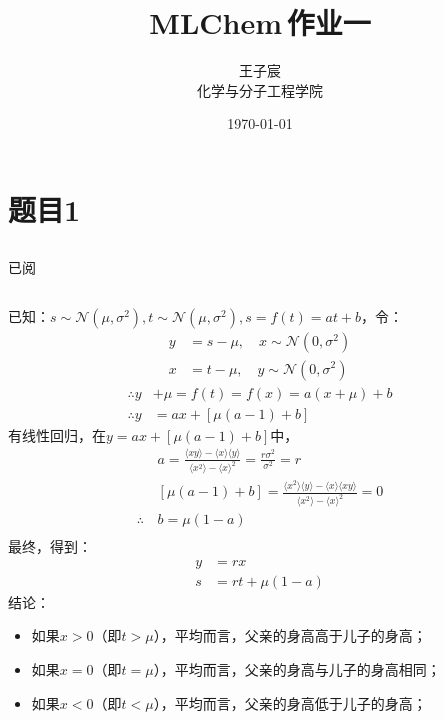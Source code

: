 \documentclass{article}
\title{\huge{\textbf{MLChem\,作业一}}}
\author{\kaishu 2100011873 王子宸\\
        \kaishu 化学与分子工程学院}
\date{\kaishu \today}
\begin{document}
\maketitle

\section{题目1}

\subsection{}
已阅
\subsection{}

已知：$s\sim \mathcal{N}(\mu,\sigma^2), t\sim \mathcal{N}(\mu,\sigma^2), s = f(t) = at + b$，令：
\begin{align*}
    y &= s - \mu,\quad x\sim \mathcal{N}(0,\sigma^2)\\
    x &= t - \mu,\quad y\sim \mathcal{N}(0,\sigma^2)
\end{align*}
\begin{align*}
    \therefore  y& + \mu = f(t) = f(x) = a(x + \mu) + b\\
    \therefore  y& = ax + [\mu(a-1)+b]
\end{align*}
有线性回归，在$y = ax + [\mu(a-1)+b]$中，
\begin{align*}
    &a = \frac{\langle xy \rangle-\langle x\rangle\langle y\rangle}{\langle x^2\rangle-\langle x\rangle^2} = \frac{r\sigma^2}{\sigma^2} = r\\
    &[\mu(a-1)+b] = \frac{\langle x^2\rangle\langle y\rangle-\langle x\rangle\langle xy\rangle}{\langle x^2\rangle-\langle x\rangle^2} = 0\\
    \therefore \,&b = \mu(1-a)\\
\end{align*}
最终，得到：
\begin{align*}
    y &= rx\\
    s &= rt + \mu(1-a)
\end{align*}
结论：
\begin{itemize}
    \item 如果$x>0$（即$t>\mu$），平均而言，父亲的身高高于儿子的身高；
    \item 如果$x=0$（即$t=\mu$），平均而言，父亲的身高与儿子的身高相同；
    \item 如果$x<0$（即$t<\mu$），平均而言，父亲的身高低于儿子的身高；
\end{itemize}
\end{document}
